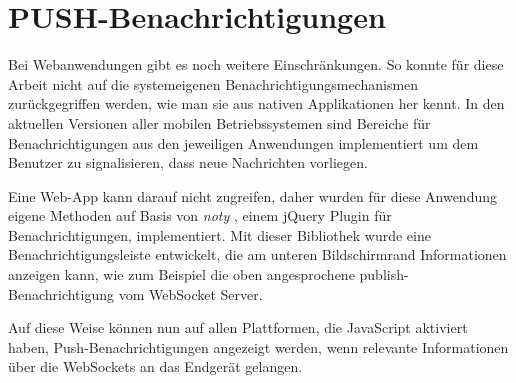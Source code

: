 \section{PUSH-Benachrichtigungen}
Bei Webanwendungen gibt es noch weitere Einschränkungen. So konnte für diese Arbeit nicht auf die systemeigenen Benachrichtigungsmechanismen zurückgegriffen werden, wie man sie aus nativen Applikationen her kennt. In den aktuellen Versionen aller mobilen Betriebssystemen sind Bereiche für Benachrichtigungen aus den jeweiligen Anwendungen implementiert um dem Benutzer zu signalisieren, dass neue Nachrichten vorliegen.\par

Eine Web-App kann darauf nicht zugreifen, daher wurden für diese Anwendung eigene Methoden auf Basis von \emph{noty} \cite{noty}, einem jQuery Plugin für Benachrichtigungen, implementiert. Mit dieser Bibliothek wurde eine Benachrichtigungsleiste entwickelt, die am unteren Bildschirmrand Informationen anzeigen kann, wie zum Beispiel die oben angesprochene publish-Benachrichtigung vom WebSocket Server.\par

Auf diese Weise können nun auf allen Plattformen, die JavaScript aktiviert haben, Push-Benachrichtigungen angezeigt werden, wenn relevante Informationen über die WebSockets an das Endgerät gelangen.














